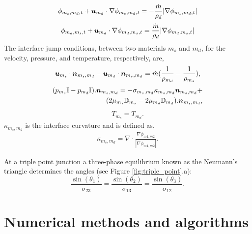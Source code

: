 \documentclass[]{article}
\newcommand{\bmu}{\mbox{\boldmath $u$\unboldmath}}
\newcommand{\bmn}{\mbox{\boldmath $n$\unboldmath}}
\newcommand{\DefTen}{\mathbb{D}}
\newcommand{\EyeTen}{\mathbb{I}}
\begin{document}
\begin{itemize}
\begin{eqnarray}
\phi_{m_{s},m_{d},t} + 
\bmu_{m_{d}}\cdot\nabla\phi_{m_{s},m_{d},t} =
-\frac{\dot{m}}{\rho_{d}}|\nabla\phi_{m_{s},m_{d},t}|
\end{eqnarray}
\begin{eqnarray}
\phi_{m_{d},m_{s},t} + 
\bmu_{m_{d}}\cdot\nabla\phi_{m_{d},m_{s},t} =
\frac{\dot{m}}{\rho_{d}}|\nabla\phi_{m_{d},m_{s},t}|
\end{eqnarray}
The interface jump conditions,
between two materials $m_{s}$ and $m_{d}$,
for the velocity, pressure, 
and temperature, respectively, are,
\begin{eqnarray*}
 \bmu_{m_{s}}\cdot \bmn_{m_{s},m_{d}}-
 \bmu_{m_{d}}\cdot \bmn_{m_{s},m_{d}} = 
\dot{m}(\frac{1}{\rho_{m_{d}}}-
	\frac{1}{\rho_{m_{s}}}),
\end{eqnarray*}
\begin{eqnarray*}
	(p_{m_{s}}\EyeTen-
	 p_{m_{d}}\EyeTen).\bmn_{m_{s},m_{d}}=
	-\sigma_{m_{s},m_{d}}\kappa_{m_{s},m_{d}}\bmn_{m_{s},m_{d}} + \\
	(2\mu_{m_{s}}\DefTen_{m_{s}}-
	 2\mu_{m_{d}}\DefTen_{m_{d}}).\bmn_{m_{s},m_{d}},
\end{eqnarray*}
\begin{eqnarray}
	T_{m_{s}}=
	T_{m_{d}}.
	\label{temperature_jump}
\end{eqnarray}
$\kappa_{m_{s},m_{d}}$ is the interface curvature
and is defined as,
\begin{eqnarray*}
	\kappa_{m_{s},m_{d}}=\nabla\cdot
	\frac{\nabla\phi_{m1,m2}}
             {|\nabla\phi_{m1,m2}|}.
\end{eqnarray*}

At a triple point junction a three-phase equilibrium known as the 
Neumann's triangle\cite{de2013capillarity} determines the 
angles (see Figure \ref{fig:triple_point}.a):
\begin{equation}
  \label{eq:triple_point_eqlib}
  \frac{\sin(\theta_{1})}{\sigma_{23}}=
  \frac{\sin(\theta_{2})}{\sigma_{13}}=
  \frac{\sin(\theta_{3})}{\sigma_{12}}.
\end{equation}

\end{itemize}


\section{Numerical methods and algorithms}
\end{document}
